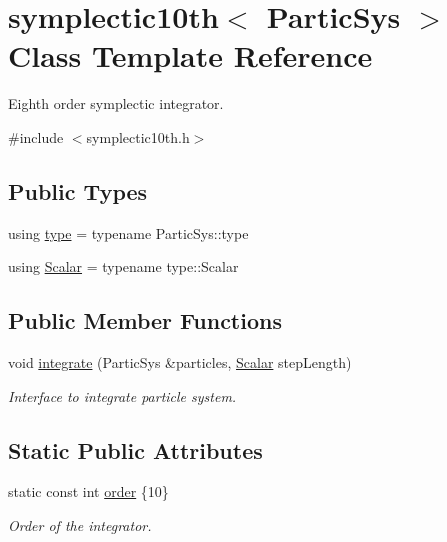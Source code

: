 \hypertarget{classsymplectic10th}{}\section{symplectic10th$<$ Partic\+Sys $>$ Class Template Reference}
\label{classsymplectic10th}


Eighth order symplectic integrator.  




{\ttfamily \#include $<$symplectic10th.\+h$>$}

\subsection*{Public Types}
\begin{DoxyCompactItemize}
\item 
using \mbox{\hyperlink{classsymplectic10th_a4fe3f3c6f8e672f40426f52512e083a5}{type}} = typename Partic\+Sys\+::type
\item 
using \mbox{\hyperlink{classsymplectic10th_a700bbf7a6116e27ac7c6bfd0cc3018bc}{Scalar}} = typename type\+::\+Scalar
\end{DoxyCompactItemize}
\subsection*{Public Member Functions}
\begin{DoxyCompactItemize}
\item 
void \mbox{\hyperlink{classsymplectic10th_aaa762c854968f135a0a6b01c908c7636}{integrate}} (Partic\+Sys \&particles, \mbox{\hyperlink{classsymplectic10th_a700bbf7a6116e27ac7c6bfd0cc3018bc}{Scalar}} step\+Length)
\begin{DoxyCompactList}\small\item\em Interface to integrate particle system. \end{DoxyCompactList}\end{DoxyCompactItemize}
\subsection*{Static Public Attributes}
\begin{DoxyCompactItemize}
\item 
static const int \mbox{\hyperlink{classsymplectic10th_af1cb88e94e3022b5bf90091d03c609a4}{order}} \{10\}
\begin{DoxyCompactList}\small\item\em Order of the integrator. \end{DoxyCompactList}\end{DoxyCompactItemize}


